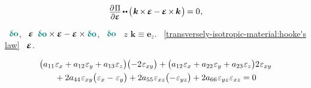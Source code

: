 {\nopagebreak\vspace{-0.1em}
\begin{equation}
\label{transversely-isotropic-material:hooke's law}
\scalebox{.9}{$
   \displaystyle\frac{%
      \raisemath{-0.2em}{ \partial \hspace{.2ex} \potentialenergydensity }}%
      { \partial \infinitesimaldeformation }
$} %
\hspace{-.2ex} \dotdotp \hspace{-.2ex} %
\bigl( \hspace{.2ex}
   \bm{k}
   \hspace{-.2ex} \times \hspace{-.2ex}
   \infinitesimaldeformation
   \hspace{-.1ex} - \hspace{-.1ex}
   \infinitesimaldeformation
   \hspace{-.2ex} \times \hspace{-.2ex}
   \bm{k}
\hspace{.2ex} \bigr) \hspace{-.2ex}
= 0
\hspace{.1ex}
,
\end{equation}

\noindent
{}
~${ \varvector{\bm{o}} }$,
~$\infinitesimaldeformation$
${
   \varvector{\bm{o}} \times \infinitesimaldeformation
   - \infinitesimaldeformation \times \varvector{\bm{o}}
}$,
~$\varvector{\bm{o}}$
~$z$
${\bm{k} \equiv \bm{e}_z}$.
~\eqref{transversely-isotropic-material:hooke's law}
~$\infinitesimaldeformation$.

\noindent
\begin{gather*}\label{equationforelasticmoduliforatransverselyisotropicmaterial}
\bigl(
    a_{11} \infinitesimaldeformationcomponents{x}
  + a_{12} \infinitesimaldeformationcomponents{y}
  + a_{13} \infinitesimaldeformationcomponents{z}
\bigr)
\bigl(
  - 2 \infinitesimaldeformationcomponents{xy}
\bigr)
+
\bigl(
    a_{12} \infinitesimaldeformationcomponents{x}
  + a_{22} \infinitesimaldeformationcomponents{y}
  + a_{23} \infinitesimaldeformationcomponents{z}
\bigr) 2 \infinitesimaldeformationcomponents{xy}
\\
%
{}+ 2 a_{44} \infinitesimaldeformationcomponents{xy}
  \bigl( \infinitesimaldeformationcomponents{x} - \infinitesimaldeformationcomponents{y} \bigr)
+ 2 a_{55} \infinitesimaldeformationcomponents{xz}
  \bigl( -\infinitesimaldeformationcomponents{yz} \bigr)
+ 2 a_{66} \infinitesimaldeformationcomponents{yz} \infinitesimaldeformationcomponents{xz}
= 0
\end{gather*}

}
